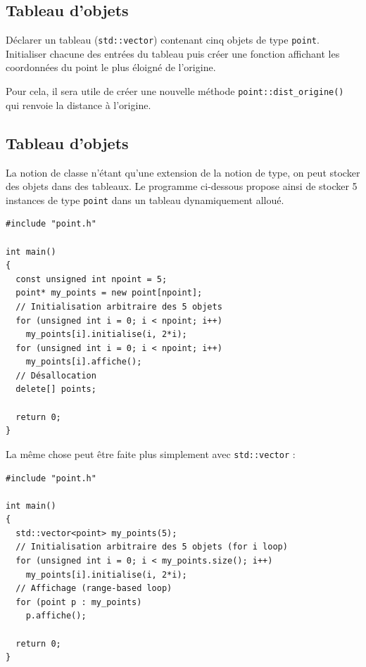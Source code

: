 \documentclass{book}
\newcommand{\inline}[1]{\texttt{#1}}
\begin{document}
\subsection{Tableau d'objets}

Déclarer un tableau (\inline{std::vector}) contenant cinq objets de type \texttt{point}. Initialiser chacune
des entrées du tableau puis créer une fonction affichant les coordonnées du
point le plus éloigné de l'origine.

Pour cela, il sera utile de créer une nouvelle méthode \inline{point::dist_origine()} qui renvoie la distance à l'origine.

\begin{correction}

\subsection*{Tableau d'objets}
La notion de classe n'étant qu'une extension de la notion de type, on peut
stocker des objets dans des tableaux. Le programme ci-dessous propose ainsi de
stocker 5 instances de type \texttt{point} dans un tableau dynamiquement alloué.
\begin{verbatim}
#include "point.h"

int main()
{
  const unsigned int npoint = 5;
  point* my_points = new point[npoint];
  // Initialisation arbitraire des 5 objets
  for (unsigned int i = 0; i < npoint; i++)
    my_points[i].initialise(i, 2*i);
  for (unsigned int i = 0; i < npoint; i++)
    my_points[i].affiche();
  // Désallocation
  delete[] points;

  return 0;
}
\end{verbatim}

La même chose peut être faite plus simplement avec \inline{std::vector} :
\begin{verbatim}
#include "point.h"

int main()
{
  std::vector<point> my_points(5);
  // Initialisation arbitraire des 5 objets (for i loop)
  for (unsigned int i = 0; i < my_points.size(); i++)
    my_points[i].initialise(i, 2*i);
  // Affichage (range-based loop)
  for (point p : my_points)
    p.affiche();

  return 0;
}
\end{verbatim}


\end{correction}
\end{document}
